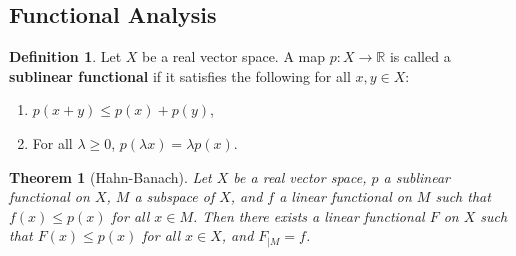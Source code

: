 \documentclass[letterpaper,10pt]{article}
\theoremstyle{definition}
\newtheorem{dfn}{Definition}
\theoremstyle{remark}
\theoremstyle{plain}
\newtheorem{thm}{Theorem}[section]
\begin{document}
\subsection{Functional Analysis}
\begin{dfn}
    Let $X$ be a real vector space. A map $p:X\rightarrow\mathbb R$ is called 
    a \textbf{sublinear functional} if it satisfies the following for all $x,y\in X$:
    \begin{enumerate}
        \item $p(x+y)\leq p(x)+p(y)$,
        \item For all $\lambda\geq 0$, $p(\lambda x)=\lambda p(x)$.
    \end{enumerate}
\end{dfn}
\begin{thm}[Hahn-Banach]\label{thm:hahnbanach} %
    Let $X$ be a real vector space, $p$ a sublinear functional on $X$, $M$
    a subspace of $X$, and $f$ a linear functional on $M$ such that $f(x)\leq p(x)$
    for all $x\in M$.
    Then there exists a linear functional $F$ on $X$ such that $F(x)\leq p(x)$
    for all $x\in X$, and $F_{|M}=f$.
\end{thm}
\end{document}

